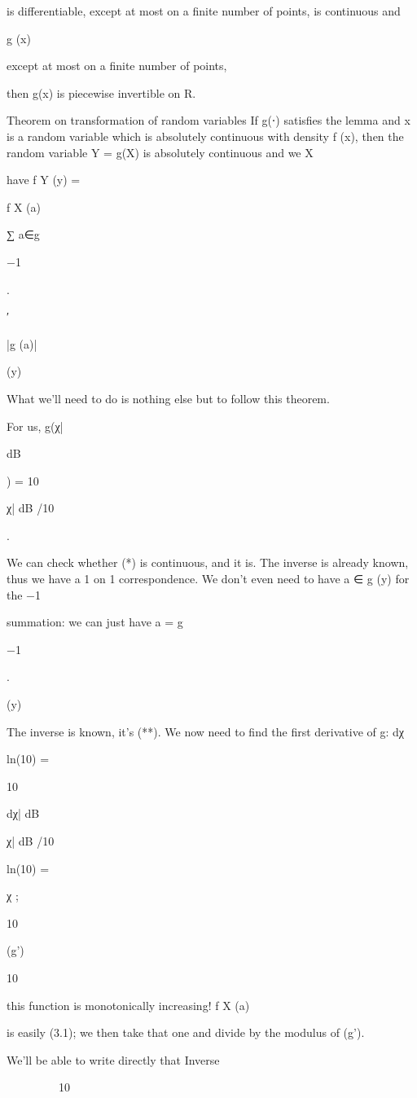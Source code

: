 {{{{is differentiable, except at most on a finite number of points,
is continuous and

g (x) 

except at most on a finite number of points,

then g(x) is piecewise invertible on R.

Theorem on transformation of random variables If g(⋅) satisfies the lemma and x is a random variable which is absolutely continuous with density f (x), then the random variable Y = g(X) is absolutely continuous and we X

have f Y (y) =

f X (a)

∑
a∈g

−1

.

′

|g (a)|

(y)

What we'll need to do is nothing else but to follow this theorem.

For us, g(χ|

dB

) = 10

χ| dB /10

.

We can check whether (*) is continuous, and it is. The inverse is already known, thus we have a 1 on 1 correspondence. We don't even need to have a ∈ g (y) for the
−1

summation: we can just have a = g

−1

.

(y)

The inverse is known, it's (**). We now need to find the first derivative of g:
dχ

ln(10)
=

10

dχ| dB

χ| dB /10

ln(10)
=

χ ;

10

(g’)

10

this function is monotonically increasing!
f X (a)

is easily (3.1); we then take that one and divide by the modulus of (g’).

We'll be able to write directly that Inverse




⎛
⎞


10

}}}}
